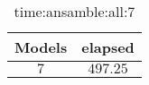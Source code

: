 \begin{table}[!ht]
	\centering
	\begin{tabular}{|c|c|}
		\hline
		Models & elapsed \\ \hline
		$7$ & $497.25$ \\ \hline
	\end{tabular}
	\caption{time:ansamble:all:7}
	\label{tab:time:ansamble:all:7}
\end{table}
